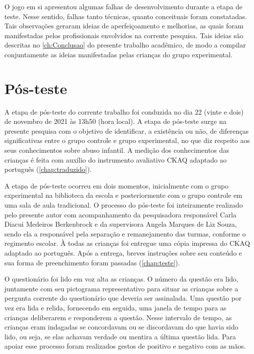 O jogo em si apresentou algumas falhas de desenvolvimento durante a etapa de teste. Nesse sentido, falhas tanto técnicas, quanto conceituais foram constatadas. Tais observações geraram ideias de aperfeiçoamento e melhorias, as quais foram manifestadas pelos profissionais envolvidos na corrente pesquisa. Tais ideias são descritas no \autoref{ch:Conclusao} do presente trabalho acadêmico, de modo a compilar conjuntamente as ideias manifestadas pelas crianças do grupo experimental. 

 
\section{Pós-teste}\label{sec:postes}

A etapa de pós-teste do corrente trabalho foi conduzida no dia 22 (vinte e dois) de novembro de 2021 às 13h50 (hora local). A etapa de pós-teste surge na presente pesquisa com o objetivo de identificar, a existência ou não, de diferenças significativas entre o grupo controle e grupo experimental, no que diz respeito aos seus conhecimentos sobre abuso infantil. A medição dos conhecimentos das crianças é feita com auxílio do instrumento avaliativo \acf{CKAQ} adaptado ao português (\autoref{chap:traduzido}). 

A etapa de pós-teste ocorreu em dois momentos, inicialmente com o grupo experimental na biblioteca da escola e posteriormente com o grupo controle em uma sala de aula tradicional. O processo do pós-teste foi inteiramente realizado pelo presente autor com acompanhamento da pesquisadora responsável Carla Diacui Medeiros Berkenbrock e da supervisora Angela Marques de Liz Souza, sendo ela a responsável pela separação e remanejamento das turmas, conforme o regimento escolar. À todas as crianças foi entregue uma cópia impressa do \ac{CKAQ} adaptado ao português. Após a entrega, breves instruções sobre seu conteúdo e sua forma de preenchimento foram passadas (\autoref{chap:teste}).

O questionário foi lido em voz alta as crianças. O número da questão era lido, juntamente com seu pictograma representativo para situar as crianças sobre a pergunta corrente do questionário que deveria ser assinalada. Uma questão por vez era lida e relida, fornecendo em seguida, uma janela de tempo para as crianças deliberarem e responderem a questão. Nesse intervalo de tempo, as crianças eram indagadas se concordavam ou se discordavam do que havia sido lido, ou seja, se elas achavam verdade ou mentira a última questão lida. Para apoiar esse processo foram realizados gestos de positivo e negativo com as mãos.

